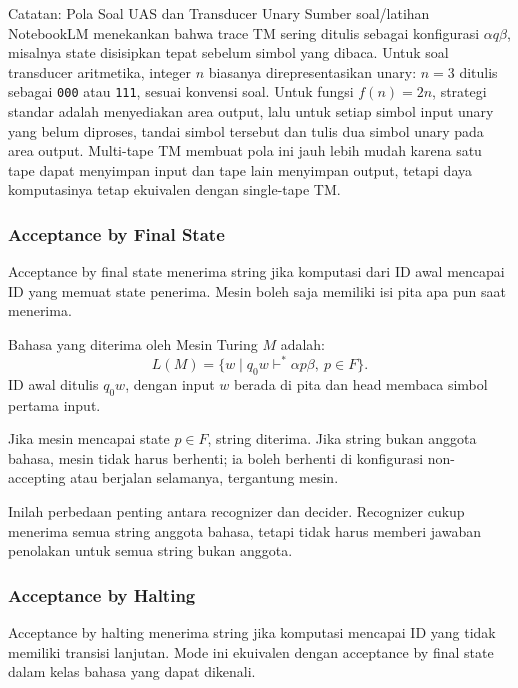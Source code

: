 \begin{cmt}{Catatan: Pola Soal UAS dan Transducer Unary}{}
Sumber soal/latihan NotebookLM menekankan bahwa trace TM sering ditulis sebagai konfigurasi $\alpha q\beta$, misalnya state disisipkan tepat sebelum simbol yang dibaca. Untuk soal transducer aritmetika, integer $n$ biasanya direpresentasikan unary: $n=3$ ditulis sebagai \texttt{000} atau \texttt{111}, sesuai konvensi soal. Untuk fungsi $f(n)=2n$, strategi standar adalah menyediakan area output, lalu untuk setiap simbol input unary yang belum diproses, tandai simbol tersebut dan tulis dua simbol unary pada area output. Multi-tape TM membuat pola ini jauh lebih mudah karena satu tape dapat menyimpan input dan tape lain menyimpan output, tetapi daya komputasinya tetap ekuivalen dengan single-tape TM.
\end{cmt}

\subsubsection{Acceptance by Final State}

\begin{jawab}
Acceptance by final state menerima string jika komputasi dari ID awal mencapai ID yang memuat state penerima. Mesin boleh saja memiliki isi pita apa pun saat menerima.
\end{jawab}

Bahasa yang diterima oleh Mesin Turing $M$ adalah:
\[
    L(M)=\{w\mid q_0w\vdash^*\alpha p\beta,\ p\in F\}.
\]
ID awal ditulis $q_0w$, dengan input $w$ berada di pita dan head membaca simbol pertama input.

Jika mesin mencapai state $p\in F$, string diterima. Jika string bukan anggota bahasa, mesin tidak harus berhenti; ia boleh berhenti di konfigurasi non-accepting atau berjalan selamanya, tergantung mesin.

Inilah perbedaan penting antara recognizer dan decider. Recognizer cukup menerima semua string anggota bahasa, tetapi tidak harus memberi jawaban penolakan untuk semua string bukan anggota.

\subsubsection{Acceptance by Halting}

\begin{jawab}
Acceptance by halting menerima string jika komputasi mencapai ID yang tidak memiliki transisi lanjutan. Mode ini ekuivalen dengan acceptance by final state dalam kelas bahasa yang dapat dikenali.
\end{jawab}

